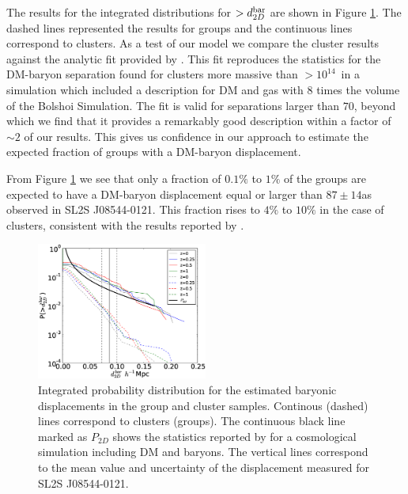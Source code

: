 \documentclass{emulateapj}
\newcommand{\hkpc}{{\ifmmode{h^{-1}{\rm kpc}}\else{$h^{-1}$kpc }\fi}}
\newcommand{\hMsun}{{\ifmmode{h^{-1}{\rm {M_{\odot}}}}\else{$h^{-1}{\rm{M_{\odot}}}$}\fi}}
\newcommand{\bullg}{SL2S J08544-0121}
\begin{document}
The results for the integrated distributions for $>d_{2D}^{\rm bar}$
are shown in Figure \ref{fig:baryonic_displacements}. The dashed lines
represented the results for groups and the continuous lines correspond
to clusters. As a test of our model we compare the cluster results
against the analytic fit provided by \cite{ForeroRomero2010}. This fit
reproduces the statistics for the DM-baryon separation found for
clusters more massive than $>10^{14}$\hMsun\ in a simulation
which included a description for DM and gas with $8$ times the volume of the
Bolshoi Simulation. The fit is valid for separations larger than
$70$\hkpc, beyond which we find that it provides a remarkably good
description within a factor of $\sim 2$ of our results. This gives us
confidence in our approach to estimate the expected fraction of
groups with a DM-baryon displacement.

From Figure \ref{fig:baryonic_displacements} we see that only a
fraction of $0.1\%$ to $1\%$ of the groups are expected to have a
DM-baryon displacement equal or larger than $87\pm 14$\hkpc as
observed in \bullg. This fraction rises to $4\%$ to $10\%$ in the case
of clusters, consistent with the results reported by
\cite{ForeroRomero2010}. 



\begin{figure}
\begin{center}
\includegraphics[width=0.5\textwidth]{figure_4.eps}
\end{center}
\caption{Integrated probability distribution for the estimated
  baryonic displacements in the group and cluster samples. Continous (dashed)
  lines correspond to clusters (groups). The continuous black line
  marked as $P_{2D}$ shows the statistics reported by
  \citet{ForeroRomero2010} for a cosmological simulation including DM
  and baryons. The vertical lines correspond to the mean value and
  uncertainty of the displacement measured for \bullg.} 
\label{fig:baryonic_displacements}
\end{figure}
\end{document}
